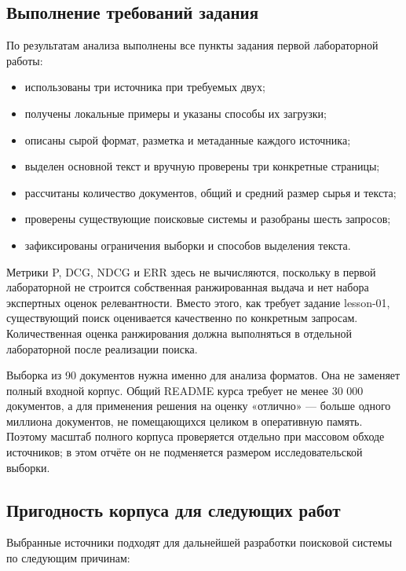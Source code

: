 \documentclass[pdf,unicode,12pt,a4paper,oneside,fleqn]{article}
\begin{document}
\subsection{Выполнение требований задания}

По результатам анализа выполнены все пункты задания первой лабораторной работы:

\begin{itemize}
    \item использованы три источника при требуемых двух;
    \item получены локальные примеры и указаны способы их загрузки;
    \item описаны сырой формат, разметка и метаданные каждого источника;
    \item выделен основной текст и вручную проверены три конкретные страницы;
    \item рассчитаны количество документов, общий и средний размер сырья и текста;
    \item проверены существующие поисковые системы и разобраны шесть запросов;
    \item зафиксированы ограничения выборки и способов выделения текста.
\end{itemize}

Метрики P, DCG, NDCG и ERR здесь не вычисляются, поскольку в первой лабораторной
не строится собственная ранжированная выдача и нет набора экспертных оценок
релевантности. Вместо этого, как требует задание lesson-01, существующий поиск
оценивается качественно по конкретным запросам. Количественная оценка
ранжирования должна выполняться в отдельной лабораторной после реализации
поиска.

Выборка из 90 документов нужна именно для анализа форматов. Она не заменяет
полный входной корпус. Общий README курса требует не менее 30 000 документов, а
для применения решения на оценку «отлично» --- больше одного миллиона
документов, не помещающихся целиком в оперативную память. Поэтому масштаб
полного корпуса проверяется отдельно при массовом обходе источников; в этом
отчёте он не подменяется размером исследовательской выборки.

\subsection{Пригодность корпуса для следующих работ}

Выбранные источники подходят для дальнейшей разработки поисковой системы по
следующим причинам:
\end{document}
